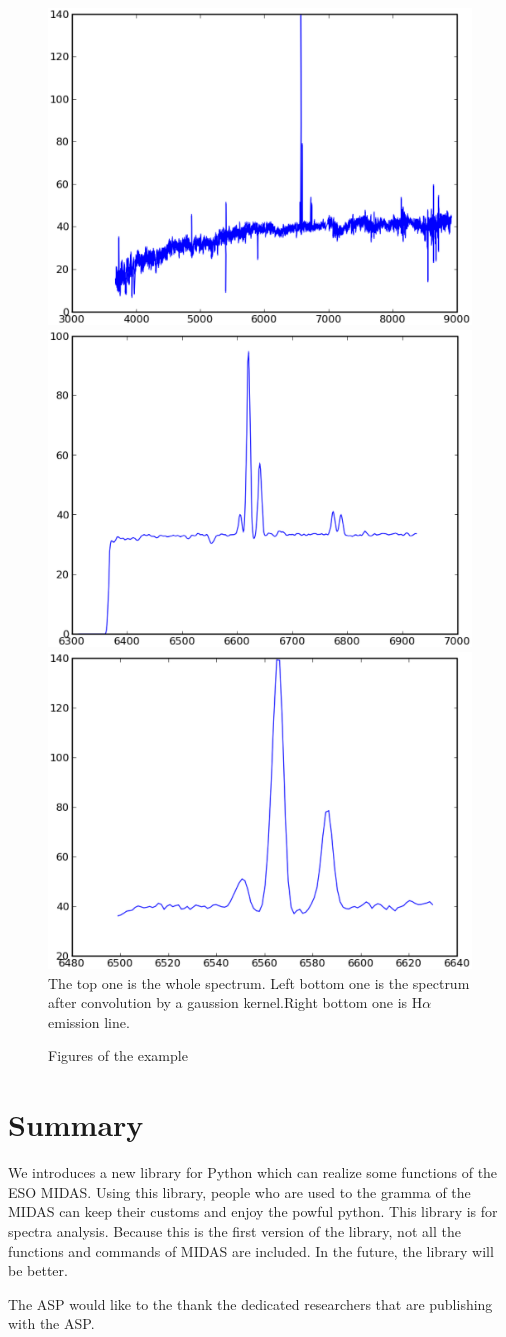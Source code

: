 \documentclass[11pt,twoside]{article}
\begin{document}
\begin{figure}[!hb]
\begin{center}
\caption{Figures of the example}
\label{fig}
\includegraphics[width=1.\textwidth, height=.2\textheight]{spectra}\\

\vskip-2pt
\includegraphics[width=.46\textwidth]{part}
\includegraphics[width=.46\textwidth]{halpha}\\
The top one is the whole spectrum. Left bottom one is the spectrum after convolution by a gaussion kernel.Right bottom one is 
H$\alpha$ emission line.
\end{center}
\end{figure}
	  \section{Summary}
We introduces a new library for Python which can realize some functions of 
the ESO MIDAS. Using this library, people who are used to the gramma of the MIDAS
can keep their customs and enjoy the powful python. This library is for spectra
analysis. Because this is the first version of the library, not all the functions 
and commands of MIDAS are included. In the future, the library will be better.

\acknowledgements The ASP would like to the thank the dedicated researchers that are publishing with the ASP.
\end{document}
